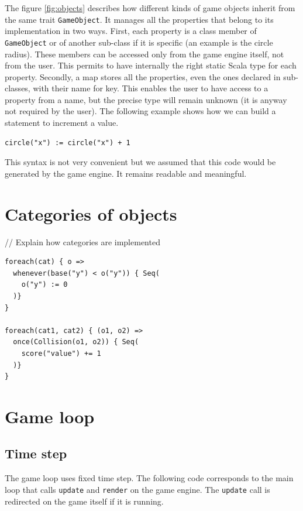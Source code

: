 \documentclass[11pt,a4paper]{article}
\begin{document}
The figure \ref{fig:objects} describes how different kinds of game objects inherit from the same trait \texttt{GameObject}. It manages all the properties that belong to its implementation in two ways. First, each property is a class member of \texttt{GameObject} or of another sub-class if it is specific (an example is the circle radius). These members can be accessed only from the game engine itself, not from the user. This permits to have internally the right static Scala type for each property. Secondly, a map stores all the properties, even the ones declared in sub-classes, with their name for key. This enables the user to have access to a property from a name, but the precise type will remain unknown (it is anyway not required by the user). The following example shows how we can build a statement to increment a value.

\begin{lstlisting}
circle("x") := circle("x") + 1
\end{lstlisting}

This syntax is not very convenient but we assumed that this code would be generated by the game engine. It remains readable and meaningful.


\section{Categories of objects}

// Explain how categories are implemented

\begin{lstlisting}
foreach(cat) { o =>
  whenever(base("y") < o("y")) { Seq(
    o("y") := 0
  )}
}

foreach(cat1, cat2) { (o1, o2) =>
  once(Collision(o1, o2)) { Seq(
    score("value") += 1
  )}  
}
\end{lstlisting}

\section{Game loop}

\subsection{Time step}
The game loop uses fixed time step. The following code corresponds to the main loop that calls \texttt{update} and \texttt{render} on the game engine. The \texttt{update} call is redirected on the game itself if it is running.
\end{document}
